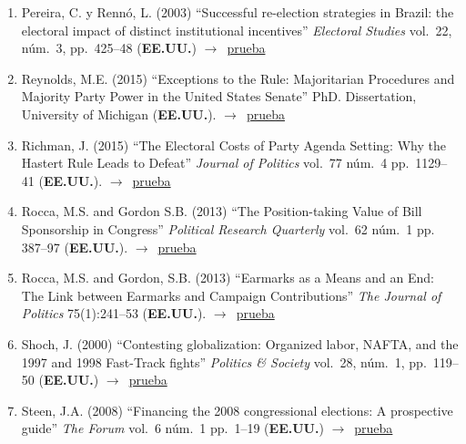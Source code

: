 \documentclass[12 pt, letter]{article}
\newenvironment{CitasMiTrabajo}{
    \begin{footnotesize}
    \begin{enumerate}[label={\footnotesize\emph{cita~\arabic*}},ref=\arabic*] %
        \setlength{\itemsep}{.1\itemsep}
        \setlength{\parskip}{.1\parskip}
    }{\end{enumerate}\end{footnotesize}}
\begin{document}
\begin{CitasMiTrabajo}
        \item Pereira, C. y Renn\'o, L. (2003)
        ``Successful re-election strategies in Brazil: the electoral impact of distinct
        institutional incentives'' \emph{Electoral Studies} vol.\ 22, n\'um.\ 3, pp.\
        425--48  (\textbf{EE.UU.}) $\rightarrow$~\href{https://github.com/emagar/cv/blob/master/citasMiTrab/coxMagar/perRenno2.pdf}{prueba}

        \item Reynolds, M.E. (2015) ``Exceptions to the Rule: Majoritarian Procedures and Majority Party Power in the United States Senate'' PhD. Dissertation, University of Michigan (\textbf{EE.UU.}). $\rightarrow$~\href{https://github.com/emagar/cv/blob/master/citasMiTrab/coxMagar/reynolds2015.pdf}{prueba}

        \item Richman, J. (2015) ``The Electoral Costs of Party Agenda Setting: Why the Hastert Rule Leads to Defeat'' \emph{Journal of Politics} vol.\ 77 n\'um.\ 4 pp.\ 1129--41 (\textbf{EE.UU.}). $\rightarrow$~\href{https://github.com/emagar/cv/blob/master/citasMiTrab/coxMagar/richmanEllCosts2015jop.pdf}{prueba}
          
        \item Rocca, M.S. and Gordon S.B. (2013) ``The Position-taking Value of Bill Sponsorship in Congress'' \emph{Political Research Quarterly} vol.\ 62 n\'um.\ 1 pp. 387--97 (\textbf{EE.UU.}). $\rightarrow$~\href{https://github.com/emagar/cv/blob/master/citasMiTrab/coxMagar/rocca.gordonPosTakSponsoring2010prq.pdf}{prueba}

        \item Rocca, M.S. and Gordon, S.B. (2013) ``Earmarks as a Means and an End: The Link between Earmarks and Campaign Contributions'' \emph{The Journal of Politics} 75(1):241--53 (\textbf{EE.UU.}). $\rightarrow$~\href{https://github.com/emagar/cv/blob/master/citasMiTrab/coxMagar/rocca.gordonEarmarks2013jop.pdf}{prueba}

        \item Shoch, J. (2000)
        ``Contesting globalization: Organized labor, NAFTA, and the 1997 and 1998 Fast-Track fights'' \emph{Politics \& Society} vol.\ 28, n\'um.\ 1, pp.\ 119--50  (\textbf{EE.UU.}) $\rightarrow$~\href{https://github.com/emagar/cv/blob/master/citasMiTrab/coxMagar/shoch.pdf}{prueba}

       \item Steen, J.A. (2008) ``Financing the 2008 congressional elections: A prospective guide'' \emph{The Forum} vol.\ 6 n\'um.\ 1 pp.\ 1--19 (\textbf{EE.UU.}) $\rightarrow$~\href{https://github.com/emagar/cv/blob/master/citasMiTrab/coxMagar/steen2008.pdf}{prueba}


\end{CitasMiTrabajo}
\end{document}
